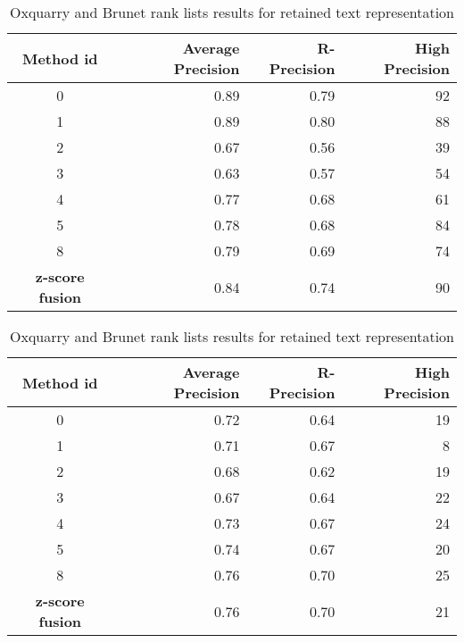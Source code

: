 \begin{table}[H]
  \centering
  \caption{Oxquarry and Brunet rank lists results for retained text representation}
  \label{tab:9rl_results_brunet_oxquarry}

  \begin{tabular}{c r r r}
    \toprule
    Method id &
    Average Precision &
    R-Precision &
    High Precision \\
    \midrule
    0 & 0.89 & 0.79 & 92 \\
    1 & 0.89 & 0.80 & 88 \\
    2 & 0.67 & 0.56 & 39 \\
    3 & 0.63 & 0.57 & 54 \\
    4 & 0.77 & 0.68 & 61 \\
    5 & 0.78 & 0.68 & 84 \\
    8 & 0.79 & 0.69 & 74 \\
    \textbf{z-score fusion} &  0.84 & 0.74 & 90 \\
    \bottomrule
  \end{tabular}

  \begin{tabular}{c r r r}
    \toprule
    Method id &
    Average Precision &
    R-Precision &
    High Precision \\
    \midrule
    0 & 0.72 & 0.64 & 19 \\
    1 & 0.71 & 0.67 & 8 \\
    2 & 0.68 & 0.62 & 19 \\
    3 & 0.67 & 0.64 & 22 \\
    4 & 0.73 & 0.67 & 24 \\
    5 & 0.74 & 0.67 & 20 \\
    8 & 0.76 & 0.70 & 25 \\
    \textbf{z-score fusion} & 0.76 &  0.70 & 21 \\
    \bottomrule
  \end{tabular}

\end{table}


